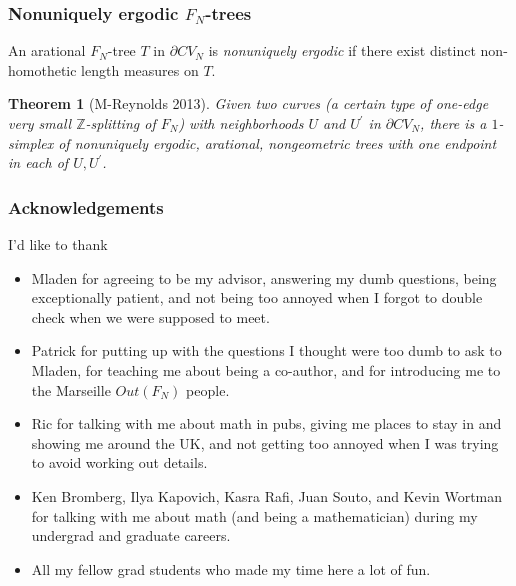 \documentclass{beamer}
\theoremstyle{theorem}
\newtheorem{thm}{Theorem}
\theoremstyle{definition}
\newcommand{\Z}{\ensuremath{\mathbb Z}}
\renewcommand{\-}{\ensuremath{^{-1}}}
\renewcommand{\>}{\ensuremath{\rightarrow}}
\newcommand{\pr}{^{\prime}}
\newcommand{\del}{\partial}
\renewcommand{\(}{\langle}
\renewcommand{\)}{\rangle}
\begin{document}
\begin{frame}
\frametitle{Nonuniquely ergodic $F_N$-trees}
An arational $F_N$-tree $T$ in $\del CV_N$ is \emph{nonuniquely ergodic} if there exist distinct non-homothetic length measures on $T$.
\pause
\begin{thm}[M-Reynolds \cite{MR13} 2013]
Given two curves (a certain type of one-edge very small $\Z$-splitting of $F_N$) with neighborhoods $U$ and $U\pr$ in $\del CV_N$, there is a $1$-simplex of nonuniquely ergodic, arational, nongeometric trees with one endpoint in each of $U, U\pr$.  
\end{thm}
\end{frame}

\begin{frame}
\frametitle{Acknowledgements}

I'd like to thank 
\begin{itemize}
\item Mladen for agreeing to be my advisor, answering my dumb questions, being exceptionally patient, and not being too annoyed when I forgot to double check when we were supposed to meet.

\item Patrick for putting up with the questions I thought were too dumb to ask to Mladen, for teaching me about being a co-author, and for introducing me to the Marseille $Out(F_N)$ people.

\item Ric for talking with me about math in pubs, giving me places to stay in and showing me around the UK, and not getting too annoyed when I was trying to avoid working out details.

\item Ken Bromberg, Ilya Kapovich, Kasra Rafi, Juan Souto, and Kevin Wortman for talking with me about math (and being a mathematician) during my undergrad and graduate careers.    

\item All my fellow grad students who made my time here a lot of fun.
\end{itemize}
\end{frame}



\end{document}
